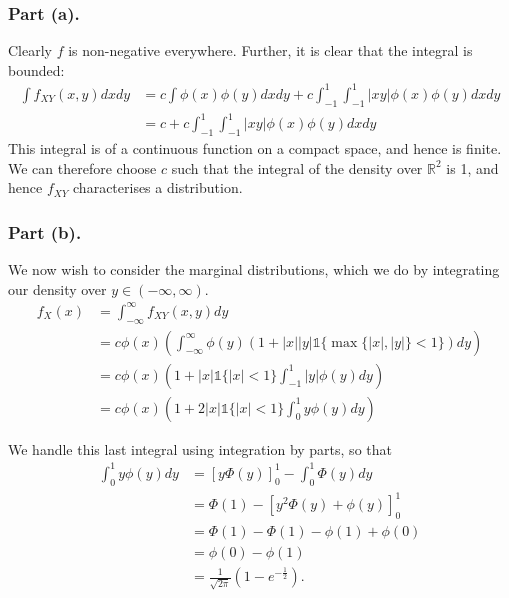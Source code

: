 \documentclass{article}
\begin{document}
\subsubsection{Part (a).}
Clearly $f$ is non-negative everywhere. Further, it is clear that the integral is bounded:
\begin{equation}\begin{split}
\int f_{XY}(x,y)dxdy &=c\int\phi(x)\phi(y)dxdy + c\int_{-1}^{1}\int_{-1}^{1}|xy|\phi(x)\phi(y)dxdy\\
&=c+c\int_{-1}^{1}\int_{-1}^{1}|xy|\phi(x)\phi(y)dxdy
\end{split}\end{equation}
This integral is of a continuous function on a compact space, and hence is finite. We can therefore choose $c$ such that the integral of the density over $\mathbb{R}^{2}$ is 1, and hence $f_{XY}$ characterises a distribution.

\subsubsection{Part (b).}
We now wish to consider the marginal distributions, which we do by integrating our density over $y\in(-\infty,\infty)$. 
\begin{equation}\begin{split}
f_{X}(x) &= \int_{-\infty}^{\infty}f_{XY}(x,y)dy \\
&= c\phi(x)\left(\int_{-\infty}^{\infty}\phi(y)(1+|x||y|\mathds{1}\{\max\{|x|,|y|\}<1\})dy\right)\\
&= c\phi(x)\left(1+|x|\mathds{1}\{|x|<1\}\int_{-1}^{1}|y|\phi(y)dy\right)\\
&=c\phi(x)\left(1+2|x|\mathds{1}\{|x|<1\}\int_{0}^{1}y\phi(y)dy\right)
\end{split}\end{equation}

We handle this last integral using integration by parts, so that
\begin{equation}\begin{split}
\int_{0}^{1}y\phi(y)dy &= \left[y\Phi(y)\right]_{0}^{1}-\int_{0}^{1}\Phi(y)dy\\
&= \Phi(1)-\left[y^{2}\Phi(y)+\phi(y)\right]_{0}^{1}\\
&=\Phi(1) - \Phi(1) - \phi(1)+\phi(0)\\
&= \phi(0)-\phi(1)\\
&= \frac{1}{\sqrt{2\pi}}(1-e^{-\frac{1}{2}}).
\end{split}\end{equation}
\end{document}
